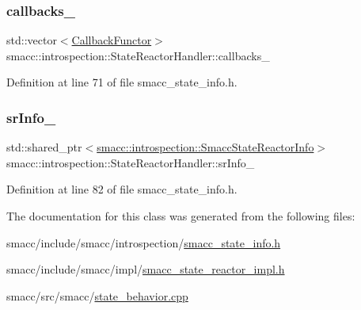 \subsubsection{\texorpdfstring{callbacks\+\_\+}{callbacks\_}}
{\footnotesize\ttfamily std\+::vector$<$\hyperlink{structsmacc_1_1introspection_1_1CallbackFunctor}{Callback\+Functor}$>$ smacc\+::introspection\+::\+State\+Reactor\+Handler\+::callbacks\+\_\+\hspace{0.3cm}{\ttfamily [private]}}



Definition at line 71 of file smacc\+\_\+state\+\_\+info.\+h.

\mbox{\label{classsmacc_1_1introspection_1_1StateReactorHandler_a30bb48cbd4712aff2683c21b85ef3e8e}} 
\subsubsection{\texorpdfstring{sr\+Info\+\_\+}{srInfo\_}}
{\footnotesize\ttfamily std\+::shared\+\_\+ptr$<$\hyperlink{structsmacc_1_1introspection_1_1SmaccStateReactorInfo}{smacc\+::introspection\+::\+Smacc\+State\+Reactor\+Info}$>$ smacc\+::introspection\+::\+State\+Reactor\+Handler\+::sr\+Info\+\_\+}



Definition at line 82 of file smacc\+\_\+state\+\_\+info.\+h.



The documentation for this class was generated from the following files\+:\begin{DoxyCompactItemize}
\item 
smacc/include/smacc/introspection/\hyperlink{smacc__state__info_8h}{smacc\+\_\+state\+\_\+info.\+h}\item 
smacc/include/smacc/impl/\hyperlink{smacc__state__reactor__impl_8h}{smacc\+\_\+state\+\_\+reactor\+\_\+impl.\+h}\item 
smacc/src/smacc/\hyperlink{state__behavior_8cpp}{state\+\_\+behavior.\+cpp}\end{DoxyCompactItemize}
